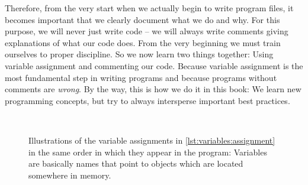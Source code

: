 Therefore, from the very start when we actually begin to write program files, it becomes important that we clearly document what we do and why.
For this purpose, we will never just write code -- we will always write comments giving explanations of what our code does.
From the very beginning we must train ourselves to proper discipline.%
%
%
%
So we now learn two things together:
Using variable assignment and commenting our code.
Because variable assignment is the most fundamental step in writing programs and because programs without comments are \emph{wrong}.
By the way, this is how we do it in this book:
We learn new programming concepts, but try to always intersperse important best practices.%
%
%
%
%
%
%
%
\begin{figure}[tb]%
\centering%
%
%
%
\floatSep%
%
%
%
\\%
%
%
%
\floatSep%
%
%
%
\caption{%
Illustrations of the variable assignments in \cref{lst:variables:assignment} in the same order in which they appear in the program: %
Variables are basically names that point to objects which are located somewhere in memory.}%
\label{fig:variable_assignment}%
\end{figure}%

